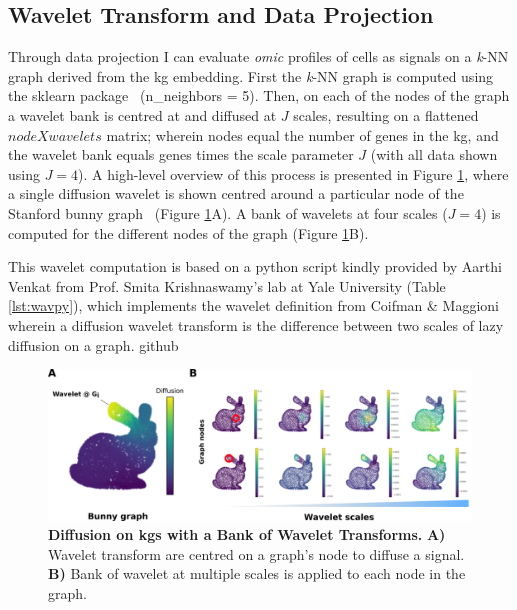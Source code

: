 \subsection{Wavelet Transform and Data Projection}

Through data projection I can evaluate \emph{omic} profiles of cells as signals on a \emph{k}-NN graph derived from the \acrshort{kg} embedding. First the \emph{k}-NN graph is computed using the sklearn package~\cite{pedregosa_scikit-learn_2011} (n\_neighbors = 5). Then, on each of the nodes of the graph a wavelet bank is centred at and diffused at \(J\) scales, resulting on a flattened \(node X wavelets\) matrix; wherein nodes equal the number of genes in the \acrshort{kg}, and the wavelet bank equals genes times the scale parameter \(J\) (with all data shown using \(J = 4\)). A high-level overview of this process is presented in Figure \ref{fig:2wav}, where a single diffusion wavelet is shown centred around a particular node of the Stanford bunny graph~\cite{turk_zippered_1994} (Figure \ref{fig:2wav}A). A bank of wavelets at four scales (\(J = 4\)) is computed for the different nodes of the graph (Figure \ref{fig:2wav}B). 

This wavelet computation is based on a python script kindly provided by Aarthi Venkat from Prof. Smita Krishnaswamy's lab at Yale University (Table \ref{lst:wavpy}), which implements the wavelet definition from Coifman \& Maggioni~\cite{coifman_diffusion_2006} wherein a diffusion wavelet transform is the difference between two scales of lazy diffusion on a graph.
github

\begin{figure}
    \centering
    \includegraphics{02methods/figs/2KG_wav.png}
    \caption{\textbf{Diffusion on \acrshort{kg}s with a Bank of Wavelet Transforms.} \textbf{A)} Wavelet transform are centred on a graph's node to diffuse a signal. \textbf{B)} Bank of wavelet at multiple scales is applied to each node in the graph.}
    \label{fig:2wav}
\end{figure}

